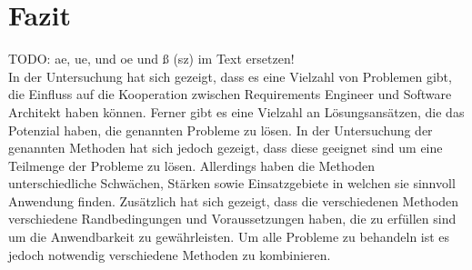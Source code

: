 \section{Fazit}

TODO: ae, ue, und oe und ß (sz) im Text ersetzen! \\

In der Untersuchung hat sich gezeigt, dass es eine Vielzahl von Problemen gibt, die Einfluss auf die Kooperation zwischen Requirements Engineer und Software Architekt haben können. Ferner gibt es eine Vielzahl an Lösungsansätzen, die das Potenzial haben, die genannten Probleme zu lösen. In der Untersuchung der genannten Methoden hat sich jedoch gezeigt, dass diese geeignet sind um eine Teilmenge der Probleme zu lösen. Allerdings haben die Methoden unterschiedliche Schwächen, Stärken sowie Einsatzgebiete in welchen sie sinnvoll Anwendung finden. Zusätzlich hat sich gezeigt, dass die verschiedenen Methoden verschiedene Randbedingungen und Voraussetzungen haben, die zu erfüllen sind um die Anwendbarkeit zu gewährleisten. Um alle Probleme zu behandeln ist es jedoch notwendig verschiedene Methoden zu kombinieren. \\